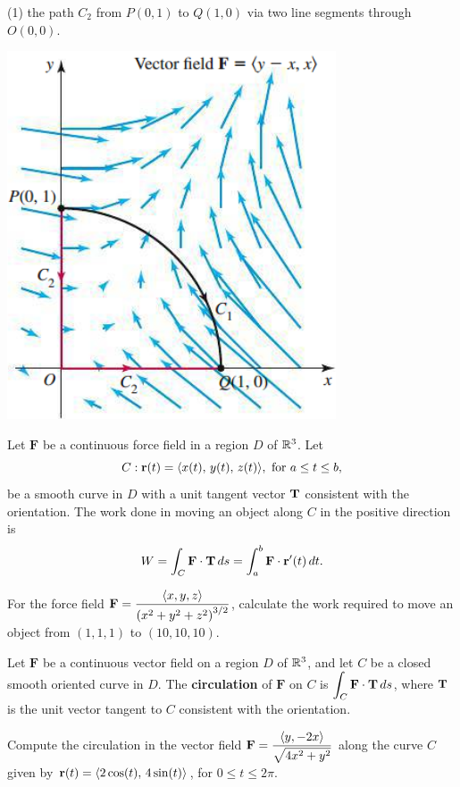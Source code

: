 \documentclass[../mathNotesPreamble]{subfiles}
\begin{document}
  \begin{tasks}[after-item-skip=\stretch{1}, label=\alph*), resume](1)
    \task 
      the path $C_2$ from $P(0,1)$ to $Q(1,0)$ via two line segments through $O(0,0)$.
  \end{tasks}
  \begin{flushright}
    \includegraphics[width=0.3\linewidth]{../images/briggs_17_02/fig17_20}
  \end{flushright}
  \pagebreak

  \begin{defn*}
    Let $\mathbf F$ be a continuous force field in a region $D$ of $\mathbb{R}^3$. Let
      \[C: {\mathbf{r}}(t)={\left\langle x(t),\,y(t),\,z(t) \right\rangle}, \textnormal{ for } a\leq t\leq b,\]
    be a smooth curve in $D$ with a unit tangent vector ${\mathbf{T}}$ consistent with the orientation. The work done in moving an object along $C$ in the positive direction is
      \[W=\int_C \mathbf F\cdot{\mathbf{T}}\,ds=\int_a^b \mathbf F\cdot{\mathbf{r}}'(t)\,dt.\]
  \end{defn*}
  \begin{ex*}
    For the force field $\mathbf F=\dfrac{{\left\langle x,y,z \right\rangle}}{{\left(x^2+y^2+z^2\right)}^{3/2}}$, calculate the work required to move an object from $(1,1,1)$ to $(10,10,10)$.
  \end{ex*}
  \pagebreak

  \begin{defn*}[Circulation]
    Let $\mathbf F$ be a continuous vector field on a region $D$ of $\mathbb{R}^3$, and let $C$ be a closed smooth oriented curve in $D$. The \textbf{circulation} of $\mathbf F$ on $C$ is $\displaystyle\int_C \mathbf F\cdot{\mathbf{T}}\,ds$, where ${\mathbf{T}}$ is the unit vector tangent to $C$ consistent with the orientation. 
  \end{defn*}

  \begin{ex*}
    Compute the circulation in the vector field $\mathbf F=\dfrac{{\left\langle y,-2x \right\rangle}}{\sqrt{4x^2+y^2}}$ along the curve $C$ given by ${\mathbf{r}}(t)={\left\langle 2\cos(t),\,4\sin(t) \right\rangle}$, for $0\leq t\leq 2\pi$.
  \end{ex*}
  \pagebreak
\end{document}
